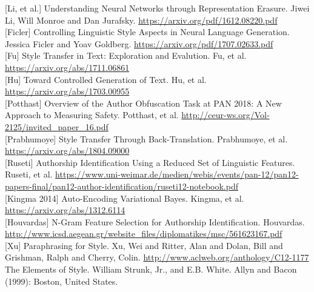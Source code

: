 \documentclass[letterpaper, 10 pt, conference]{ieeeconf}  %
\begin{document}
\begin{thebibliography}{99}

 [Li, et al.] Understanding Neural Networks through Representation Erasure. Jiwei Li, Will Monroe and Dan Jurafsky. \url{https://arxiv.org/pdf/1612.08220.pdf}
\\
 [Ficler] Controlling Linguistic Style Aspects in Neural Language Generation. Jessica Ficler and Yoav Goldberg. \url{https://arxiv.org/pdf/1707.02633.pdf}
\\
 [Fu] Style Transfer in Text: Exploration and Evalution. Fu, et al. \url{https://arxiv.org/abs/1711.06861}
\\
 [Hu] Toward Controlled Generation of Text. Hu, et al. \url{https://arxiv.org/abs/1703.00955}
\\
 [Potthast] Overview of the Author Obfuscation Task at PAN 2018: A New Approach to Measuring Safety. Potthast, et al. \url{http://ceur-ws.org/Vol-2125/invited_paper_16.pdf}
\\
 [Prabhumoye] Style Transfer Through Back-Translation. Prabhumoye, et al. \url{https://arxiv.org/abs/1804.09000}
\\
 [Ruseti] Authorship Identification Using a Reduced Set of Linguistic Features. Ruseti, et al. \url{https://www.uni-weimar.de/medien/webis/events/pan-12/pan12-papers-final/pan12-author-identification/ruseti12-notebook.pdf}
\\
 [Kingma 2014] Auto-Encoding Variational Bayes. Kingma, et al. \url{https://arxiv.org/abs/1312.6114}
\\
 [Houvardas] N-Gram Feature Selection for Authorship Identification. Houvardas. \url{http://www.icsd.aegean.gr/website_files/diplomatikes/msc/561623167.pdf}
\\
 [Xu] Paraphrasing for Style. Xu, Wei and Ritter, Alan and Dolan, Bill and Grishman, Ralph and Cherry, Colin. \url{http://www.aclweb.org/anthology/C12-1177}
\\
 The Elements of Style. William Strunk, Jr., and E.B. White. Allyn and Bacon (1999): Boston, United States.



\end{thebibliography}
\end{document}
